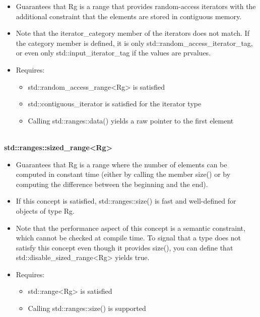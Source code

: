 \begin{itemize}
\item
Guarantees that Rg is a range that provides random-access iterators with the additional constraint that the elements are stored in contiguous memory.

\item
Note that the iterator\_category member of the iterators does not match. If the category member is defined, it is only std::random\_access\_iterator\_tag, or even only std::input\_iterator\_tag if the values are prvalues.

\item
Requires:

\begin{itemize}
\item
std::random\_access\_range<Rg> is satisfied

\item
std::contiguous\_iterator is satisfied for the iterator type

\item
Calling std::ranges::data() yields a raw pointer to the first element
\end{itemize}
\end{itemize}

\noindent
\hspace*{\fill} \\ %
\textbf{std::ranges::sized\_range<Rg>}

\begin{itemize}
\item
Guarantees that Rg is a range where the number of elements can be computed in constant time (either by calling the member size() or by computing the difference between the beginning and the end).

\item
If this concept is satisfied, std::ranges::size() is fast and well-defined for objects of type Rg.

\item
Note that the performance aspect of this concept is a semantic constraint, which cannot be checked at compile time. To signal that a type does not satisfy this concept even though it provides size(), you can define that std::disable\_sized\_range<Rg> yields true.

\item
Requires:

\begin{itemize}
\item
std::range<Rg> is satisfied

\item
Calling std::ranges::size() is supported
\end{itemize}
\end{itemize}

